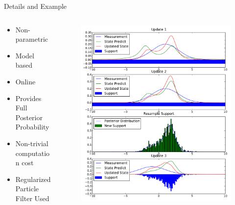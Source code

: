 \documentclass{beamer}
\begin{document}
\begin{frame}{Details and Example}
  \begin{columns}
    \begin{column}{.55\textwidth}
        \begin{itemize}
            \item Non-parametric
            \item Model based
            \item Online
            \item Provides Full Posterior Probability
            \item Non-trivial computation cost
            \item Regularized Particle Filter Used
        \end{itemize}
    \end{column}
    \begin{column}{.45\textwidth}
        \begin{figure}
          \includegraphics[width=\textwidth]{particle_filter}
        \end{figure}
    \end{column}
    \end{columns}
\end{frame}
\end{document}
